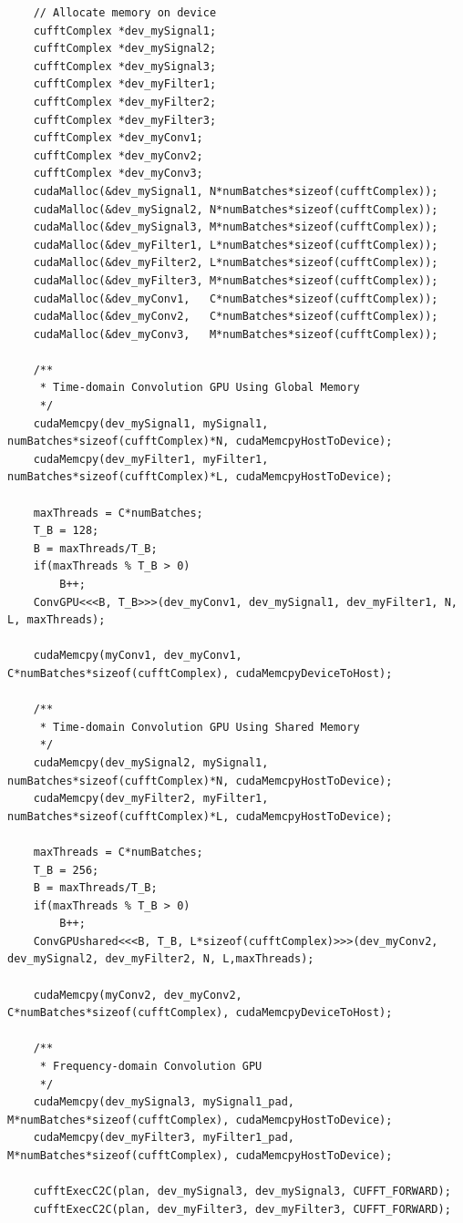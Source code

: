 \begin{lstlisting}
	// Allocate memory on device
	cufftComplex *dev_mySignal1;
	cufftComplex *dev_mySignal2;
	cufftComplex *dev_mySignal3;
	cufftComplex *dev_myFilter1;
	cufftComplex *dev_myFilter2;
	cufftComplex *dev_myFilter3;
	cufftComplex *dev_myConv1;
	cufftComplex *dev_myConv2;
	cufftComplex *dev_myConv3;
	cudaMalloc(&dev_mySignal1, N*numBatches*sizeof(cufftComplex));
	cudaMalloc(&dev_mySignal2, N*numBatches*sizeof(cufftComplex));
	cudaMalloc(&dev_mySignal3, M*numBatches*sizeof(cufftComplex));
	cudaMalloc(&dev_myFilter1, L*numBatches*sizeof(cufftComplex));
	cudaMalloc(&dev_myFilter2, L*numBatches*sizeof(cufftComplex));
	cudaMalloc(&dev_myFilter3, M*numBatches*sizeof(cufftComplex));
	cudaMalloc(&dev_myConv1,   C*numBatches*sizeof(cufftComplex));
	cudaMalloc(&dev_myConv2,   C*numBatches*sizeof(cufftComplex));
	cudaMalloc(&dev_myConv3,   M*numBatches*sizeof(cufftComplex));

	/**
	 * Time-domain Convolution GPU Using Global Memory
	 */
	cudaMemcpy(dev_mySignal1, mySignal1, numBatches*sizeof(cufftComplex)*N, cudaMemcpyHostToDevice);
	cudaMemcpy(dev_myFilter1, myFilter1, numBatches*sizeof(cufftComplex)*L, cudaMemcpyHostToDevice);

	maxThreads = C*numBatches;
	T_B = 128;
	B = maxThreads/T_B;
	if(maxThreads % T_B > 0)
		B++;
	ConvGPU<<<B, T_B>>>(dev_myConv1, dev_mySignal1, dev_myFilter1, N, L, maxThreads);

	cudaMemcpy(myConv1, dev_myConv1, C*numBatches*sizeof(cufftComplex), cudaMemcpyDeviceToHost);

	/**
	 * Time-domain Convolution GPU Using Shared Memory
	 */
	cudaMemcpy(dev_mySignal2, mySignal1, numBatches*sizeof(cufftComplex)*N, cudaMemcpyHostToDevice);
	cudaMemcpy(dev_myFilter2, myFilter1, numBatches*sizeof(cufftComplex)*L, cudaMemcpyHostToDevice);

	maxThreads = C*numBatches;
	T_B = 256;
	B = maxThreads/T_B;
	if(maxThreads % T_B > 0)
		B++;
	ConvGPUshared<<<B, T_B, L*sizeof(cufftComplex)>>>(dev_myConv2, dev_mySignal2, dev_myFilter2, N, L,maxThreads);

	cudaMemcpy(myConv2, dev_myConv2, C*numBatches*sizeof(cufftComplex), cudaMemcpyDeviceToHost);

	/**
	 * Frequency-domain Convolution GPU
	 */
	cudaMemcpy(dev_mySignal3, mySignal1_pad, M*numBatches*sizeof(cufftComplex), cudaMemcpyHostToDevice);
	cudaMemcpy(dev_myFilter3, myFilter1_pad, M*numBatches*sizeof(cufftComplex), cudaMemcpyHostToDevice);

	cufftExecC2C(plan, dev_mySignal3, dev_mySignal3, CUFFT_FORWARD);
	cufftExecC2C(plan, dev_myFilter3, dev_myFilter3, CUFFT_FORWARD);


\end{lstlisting}
